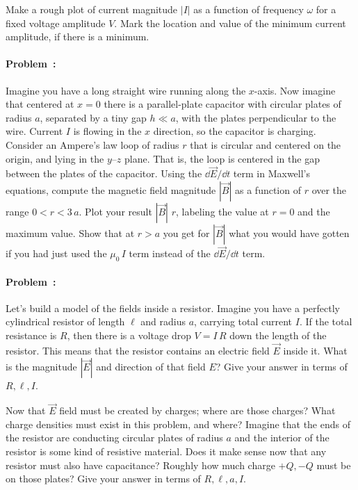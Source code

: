 \documentclass[12pt]{article}
\begin{document}
Make a rough plot of current magnitude $|I|$ as a function of
frequency $\omega$ for a fixed voltage amplitude $V$. Mark the
location and value of the minimum current amplitude, if there
is a minimum.

\paragraph{Problem~\theproblem:}%
Imagine you have a long straight wire running along the $x$-axis.
Now imagine that centered at $x=0$ there is a parallel-plate capacitor
with circular plates of radius $a$, separated by a tiny gap $h\ll a$,
with the plates perpendicular to the wire.
Current $I$ is flowing in the $x$ direction, so the capacitor is charging.
Consider an Ampere's law loop of radius $r$ that is circular
and centered on the origin, and lying in the $y$--$z$ plane.
That is, the loop is centered in the gap between the plates of the capacitor.
Using the $\dd\vec{E}/\dd t$ term in Maxwell's equations,
compute the magnetic field magnitude $|\vec{B}|$ as a function of $r$ over
the range $0<r<3\,a$.
Plot your result $|\vec{B}|$  $r$, labeling the value at
$r=0$ and the maximum value.
Show that at $r>a$ you get for $|\vec{B}|$ what you would have gotten if you had just used
the $\mu_0\,I$ term instead of the $\dd\vec{E}/\dd t$ term.

\paragraph{Problem~\theproblem:}%
Let's build a model of the fields inside a resistor.
Imagine you have a perfectly cylindrical resistor of length $\ell$ and
radius $a$, carrying total current $I$. If the total resistance is $R$,
then there is a voltage drop $V=I\,R$ down the length of the resistor. This
means that the resistor contains an electric field $\vec{E}$ inside it. What is
the magnitude $|\vec{E}|$ and direction of that field $E$?
Give your answer in terms of $R, \ell, I$.

Now that $\vec{E}$ field must be created by charges; where are those charges?
What charge densities must exist in this problem, and where? Imagine that
the ends of the resistor are conducting circular plates of radius $a$ and
the interior of the resistor is some kind of resistive material. Does it
make sense now that any resistor must also have capacitance? Roughly how
much charge $+Q, -Q$ must be on those plates?
Give your answer in terms of $R, \ell, a, I$.
\end{document}
